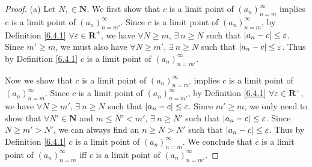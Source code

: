 \begin{proof}{(a)}
    Let \(N, \in \mathbf{N}\).
    We first show that \(c\) is a limit point of \((a_n)_{n = m}^\infty\) implies \(c\) is a limit point of \((a_n)_{n = m'}^\infty\).
    Since \(c\) is a limit point of \((a_n)_{n = m}^\infty\), by Definition \ref{6.4.1} \(\forall \varepsilon \in \mathbf{R}^+\), we have \(\forall N \geq m\), \(\exists\ n \geq N\) such that \(\abs*{a_n - c} \leq \varepsilon\).
    Since \(m' \geq m\), we must also have \(\forall N \geq m'\), \(\exists\ n \geq N\) such that \(\abs*{a_n - c} \leq \varepsilon\).
    Thus by Definition \ref{6.4.1} \(c\) is a limit point of \((a_n)_{n = m'}^\infty\).

    Now we show that \(c\) is a limit point of \((a_n)_{n = m'}^\infty\) implies \(c\) is a limit point of \((a_n)_{n = m}^\infty\).
    Since \(c\) is a limit point of \((a_n)_{n = m'}^\infty\), by Definition \ref{6.4.1} \(\forall \varepsilon \in \mathbf{R}^+\), we have \(\forall N \geq m'\), \(\exists\ n \geq N\) such that \(\abs*{a_n - c} \leq \varepsilon\).
    Since \(m' \geq m\), we only need to show that \(\forall N' \in \mathbf{N}\) and \(m \leq N' < m'\), \(\exists\ n \geq N'\) such that \(\abs*{a_n - c} \leq \varepsilon\).
    Since \(N \geq m' > N'\), we can always find an \(n \geq N > N'\) such that \(\abs*{a_n - c} \leq \varepsilon\).
    Thus by Definition \ref{6.4.1} \(c\) is a limit point of \((a_n)_{n = m}^\infty\).
    We conclude that \(c\) is a limit point of \((a_n)_{n = m}^\infty\) iff \(c\) is a limit point of \((a_n)_{n = m'}^\infty\).
\end{proof}

